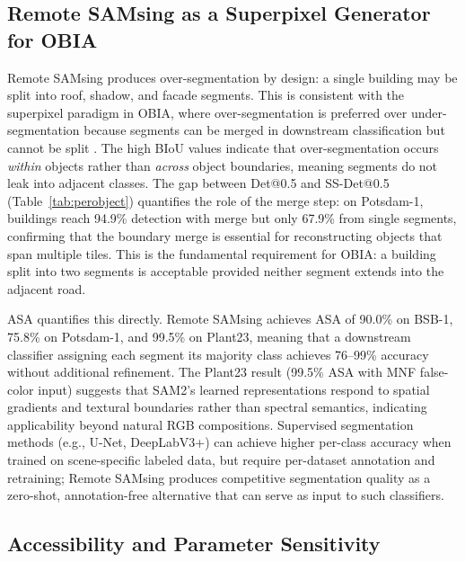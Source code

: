 \documentclass[review,11pt,authoryear]{elsarticle}
\begin{document}
\subsection{Remote SAMsing as a Superpixel Generator for OBIA}
\label{sec:disc_obia}

Remote SAMsing produces over-segmentation by design: a single building may be split into roof, shadow, and facade segments. This is consistent with the superpixel paradigm in OBIA, where over-segmentation is preferred over under-segmentation because segments can be merged in downstream classification but cannot be split \citep{blaschke2010obia, benz2004ecognition, baatz2000multiresolution}. The high BIoU values indicate that over-segmentation occurs \textit{within} objects rather than \textit{across} object boundaries, meaning segments do not leak into adjacent classes. The gap between Det@0.5 and SS-Det@0.5 (Table~\ref{tab:perobject}) quantifies the role of the merge step: on Potsdam-1, buildings reach 94.9\% detection with merge but only 67.9\% from single segments, confirming that the boundary merge is essential for reconstructing objects that span multiple tiles. This is the fundamental requirement for OBIA: a building split into two segments is acceptable provided neither segment extends into the adjacent road.

ASA \citep{stutz2018superpixels} quantifies this directly. Remote SAMsing achieves ASA of 90.0\% on BSB-1, 75.8\% on Potsdam-1, and 99.5\% on Plant23, meaning that a downstream classifier assigning each segment its majority class achieves 76--99\% accuracy without additional refinement. The Plant23 result (99.5\% ASA with MNF false-color input) suggests that SAM2's learned representations respond to spatial gradients and textural boundaries rather than spectral semantics, indicating applicability beyond natural RGB compositions. Supervised segmentation methods (e.g., U-Net, DeepLabV3+) can achieve higher per-class accuracy when trained on scene-specific labeled data, but require per-dataset annotation and retraining; Remote SAMsing produces competitive segmentation quality as a zero-shot, annotation-free alternative that can serve as input to such classifiers.

\subsection{Accessibility and Parameter Sensitivity}
\label{sec:disc_accessibility}
\end{document}
